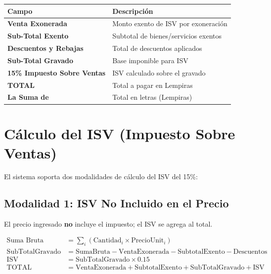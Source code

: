 \documentclass[12pt, letterpaper]{article}
\begin{document}
\begin{tabularx}{\linewidth}{>{\bfseries}l X}
  \toprule
  Campo                        & Descripción                            \\
  \midrule
  Venta Exonerada              & Monto exento de ISV por exoneración    \\
  Sub-Total Exento             & Subtotal de bienes/servicios exentos   \\
  Descuentos y Rebajas         & Total de descuentos aplicados          \\
  Sub-Total Gravado            & Base imponible para ISV                \\
  15\% Impuesto Sobre Ventas   & ISV calculado sobre el gravado         \\
  \textbf{TOTAL}               & Total a pagar en Lempiras              \\
  La Suma de                   & Total en letras (Lempiras)             \\
  \bottomrule
\end{tabularx}

\section{Cálculo del ISV (Impuesto Sobre Ventas)}

El sistema soporta dos modalidades de cálculo del ISV del 15\%:

\subsection{Modalidad 1: ISV No Incluido en el Precio}

El precio ingresado \textbf{no} incluye el impuesto; el ISV se agrega al total.

\begin{align}
  \text{Suma Bruta}        &= \sum_{i} (\text{Cantidad}_i \times \text{PrecioUnit}_i) \\
  \text{SubTotalGravado}   &= \text{SumaBruta} - \text{VentaExonerada}
                              - \text{SubtotalExento} - \text{Descuentos}             \\
  \text{ISV}               &= \text{SubTotalGravado} \times 0.15                      \\
  \text{TOTAL}             &= \text{VentaExonerada} + \text{SubtotalExento}
                              + \text{SubTotalGravado} + \text{ISV}
\end{align}
\end{document}
